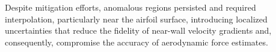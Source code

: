 \documentclass[wes, manuscript]{copernicus}
\begin{document}
Despite mitigation efforts, anomalous regions persisted and required interpolation, particularly near the airfoil surface, introducing localized uncertainties that reduce the fidelity of near-wall velocity gradients and, consequently, compromise the accuracy of aerodynamic force estimates.
%
\end{document}
